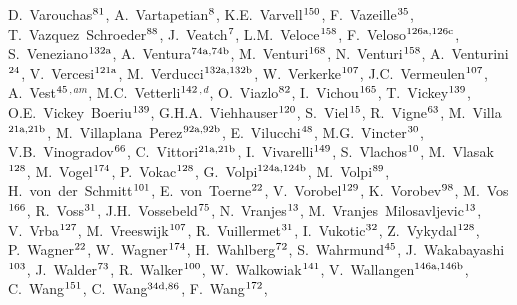 \begin{flushleft}
D.~Varouchas$^\textrm{\scriptsize 81}$,
A.~Vartapetian$^\textrm{\scriptsize 8}$,
K.E.~Varvell$^\textrm{\scriptsize 150}$,
F.~Vazeille$^\textrm{\scriptsize 35}$,
T.~Vazquez~Schroeder$^\textrm{\scriptsize 88}$,
J.~Veatch$^\textrm{\scriptsize 7}$,
L.M.~Veloce$^\textrm{\scriptsize 158}$,
F.~Veloso$^\textrm{\scriptsize 126a,126c}$,
S.~Veneziano$^\textrm{\scriptsize 132a}$,
A.~Ventura$^\textrm{\scriptsize 74a,74b}$,
M.~Venturi$^\textrm{\scriptsize 168}$,
N.~Venturi$^\textrm{\scriptsize 158}$,
A.~Venturini$^\textrm{\scriptsize 24}$,
V.~Vercesi$^\textrm{\scriptsize 121a}$,
M.~Verducci$^\textrm{\scriptsize 132a,132b}$,
W.~Verkerke$^\textrm{\scriptsize 107}$,
J.C.~Vermeulen$^\textrm{\scriptsize 107}$,
A.~Vest$^\textrm{\scriptsize 45}$$^{,am}$,
M.C.~Vetterli$^\textrm{\scriptsize 142}$$^{,d}$,
O.~Viazlo$^\textrm{\scriptsize 82}$,
I.~Vichou$^\textrm{\scriptsize 165}$,
T.~Vickey$^\textrm{\scriptsize 139}$,
O.E.~Vickey~Boeriu$^\textrm{\scriptsize 139}$,
G.H.A.~Viehhauser$^\textrm{\scriptsize 120}$,
S.~Viel$^\textrm{\scriptsize 15}$,
R.~Vigne$^\textrm{\scriptsize 63}$,
M.~Villa$^\textrm{\scriptsize 21a,21b}$,
M.~Villaplana~Perez$^\textrm{\scriptsize 92a,92b}$,
E.~Vilucchi$^\textrm{\scriptsize 48}$,
M.G.~Vincter$^\textrm{\scriptsize 30}$,
V.B.~Vinogradov$^\textrm{\scriptsize 66}$,
C.~Vittori$^\textrm{\scriptsize 21a,21b}$,
I.~Vivarelli$^\textrm{\scriptsize 149}$,
S.~Vlachos$^\textrm{\scriptsize 10}$,
M.~Vlasak$^\textrm{\scriptsize 128}$,
M.~Vogel$^\textrm{\scriptsize 174}$,
P.~Vokac$^\textrm{\scriptsize 128}$,
G.~Volpi$^\textrm{\scriptsize 124a,124b}$,
M.~Volpi$^\textrm{\scriptsize 89}$,
H.~von~der~Schmitt$^\textrm{\scriptsize 101}$,
E.~von~Toerne$^\textrm{\scriptsize 22}$,
V.~Vorobel$^\textrm{\scriptsize 129}$,
K.~Vorobev$^\textrm{\scriptsize 98}$,
M.~Vos$^\textrm{\scriptsize 166}$,
R.~Voss$^\textrm{\scriptsize 31}$,
J.H.~Vossebeld$^\textrm{\scriptsize 75}$,
N.~Vranjes$^\textrm{\scriptsize 13}$,
M.~Vranjes~Milosavljevic$^\textrm{\scriptsize 13}$,
V.~Vrba$^\textrm{\scriptsize 127}$,
M.~Vreeswijk$^\textrm{\scriptsize 107}$,
R.~Vuillermet$^\textrm{\scriptsize 31}$,
I.~Vukotic$^\textrm{\scriptsize 32}$,
Z.~Vykydal$^\textrm{\scriptsize 128}$,
P.~Wagner$^\textrm{\scriptsize 22}$,
W.~Wagner$^\textrm{\scriptsize 174}$,
H.~Wahlberg$^\textrm{\scriptsize 72}$,
S.~Wahrmund$^\textrm{\scriptsize 45}$,
J.~Wakabayashi$^\textrm{\scriptsize 103}$,
J.~Walder$^\textrm{\scriptsize 73}$,
R.~Walker$^\textrm{\scriptsize 100}$,
W.~Walkowiak$^\textrm{\scriptsize 141}$,
V.~Wallangen$^\textrm{\scriptsize 146a,146b}$,
C.~Wang$^\textrm{\scriptsize 151}$,
C.~Wang$^\textrm{\scriptsize 34d,86}$,
F.~Wang$^\textrm{\scriptsize 172}$,

\end{flushleft}
